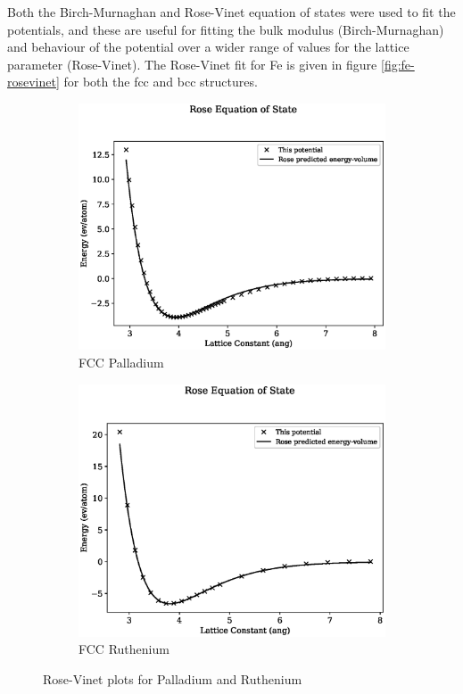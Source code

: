 Both the Birch-Murnaghan and Rose-Vinet equation of states were used to fit the potentials, and these are useful for fitting the bulk modulus (Birch-Murnaghan) and behaviour of the potential over a wider range of values for the lattice parameter (Rose-Vinet). The Rose-Vinet fit for Fe is given in figure \ref{fig:fe-rosevinet} for both the \acrshort{fcc} and \acrshort{bcc} structures.

\begin{figure}[htb]
\begin{subfigure}{.48\textwidth}
  \centering
  \includegraphics[width=.94\linewidth]{chapters/potentials_fe_pd_ru/fepd_potential/eos/rose_plot_bp_2.eps}  
  \caption{FCC Palladium}
  \label{fig:rose-vinet-fcc-pd}
\end{subfigure}
\begin{subfigure}{.48\textwidth}
  \centering
  \includegraphics[width=.94\linewidth]{chapters/potentials_fe_pd_ru/feru_potential/eos/rose_plot_bp_2.eps}  
  \caption{FCC Ruthenium}
  \label{fig:rose-vinet-fcc-ru}
\end{subfigure}
\caption{Rose-Vinet plots for Palladium and Ruthenium}
\label{fig:rupd-rosevinet}
\end{figure}

